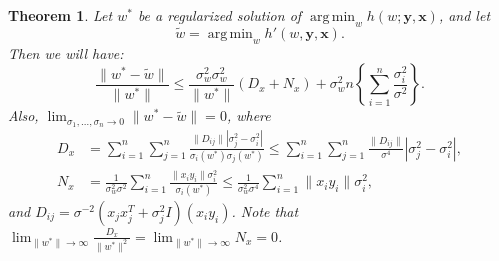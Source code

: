 \documentclass[12pt]{article}
\newtheorem{theorem}{Theorem}[section]
\DeclareMathOperator*{\argmin}{arg\,min}
\begin{document}
	\begin{theorem}
		Let $w^*$ be a regularized solution of $\argmin_w h(w; \mathbf{y}, \mathbf{x})$, and let
		\begin{equation}
			\tilde{w} = \argmin_w h'(w, \mathbf{y}, \mathbf{x}).
		\end{equation}
		Then we will have:
		\begin{equation}
			\frac{\|w^* - \tilde{w}\|}{\|w^*\|} \le \frac{\sigma_w^2 \sigma_w^2}{ \|w^*\|} \left( D_x + N_x \right) + \sigma_w^2 n \left\{ \sum_{i=1}^{n} \frac{\sigma_i^2}{\sigma^2} \right\}.
		\end{equation}
		Also, $\lim_{\sigma_1, \ldots, \sigma_n \to 0} \|w^* - \tilde{w}\| = 0$, where
		\begin{align}
			D_x &= \sum_{i=1}^{n} \sum_{j=1}^{n} \frac{\|D_{ij}\| |\sigma_j^2 - \sigma_i^2|}{\sigma_i(w^*) \sigma_j(w^*)} \le \sum_{i=1}^{n} \sum_{j=1}^{n} \frac{\|D_{ij}\|}{\sigma^4} |\sigma_j^2 - \sigma_i^2|, \\
			N_x &= \frac{1}{\sigma_w^2 \sigma^2} \sum_{i=1}^{n} \frac{\|x_i y_i\| \sigma_i^2}{\sigma_i(w^*)} \le \frac{1}{\sigma_w^2 \sigma^4} \sum_{i=1}^{n} \|x_i y_i\| \sigma_i^2,
		\end{align}
		and $D_{ij} = \sigma^{-2}(x_j x_j^T + \sigma_j^2 I)(x_i y_i)$. Note that $\lim_{\|w^*\| \to \infty} \frac{D_x}{\|w^*\|^2} = \lim_{\|w^*\| \to \infty} N_x = 0$.
	\end{theorem}
	
\end{document}
